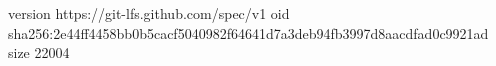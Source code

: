 version https://git-lfs.github.com/spec/v1
oid sha256:2e44ff4458bb0b5cacf5040982f64641d7a3deb94fb3997d8aacdfad0c9921ad
size 22004
